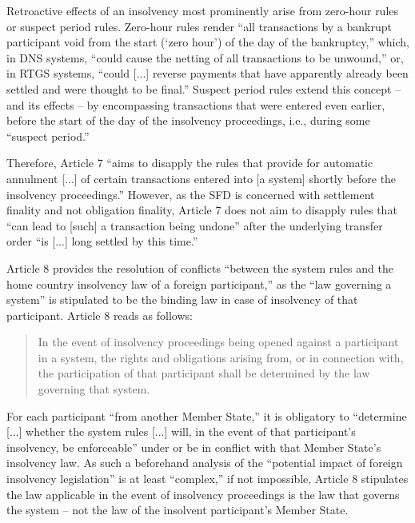 Retroactive effects of an insolvency most prominently arise from zero-hour rules or suspect period rules.
Zero-hour rules render ``all transactions by a bankrupt participant void from the start (`zero hour') of the day of the bankruptcy,'' which, in DNS systems, ``could cause the netting of all transactions to be unwound,'' or, in RTGS systems, ``could [...] reverse payments that have apparently already been settled and were thought to be final.'' \autocite[17]{cpmi2001}
Suspect period rules extend this concept -- and its effects -- by encompassing transactions that were entered even earlier, before the start of the day of the insolvency proceedings, i.e., during some ``suspect period.'' \autocite[57]{vereecken2003}

Therefore, Article 7 ``aims to disapply the rules that provide for automatic annulment [...] of certain transactions entered into [a system] shortly before the insolvency proceedings.'' \autocite[57]{vereecken2003}
However, as the SFD is concerned with settlement finality and not obligation finality, Article 7 does not aim to disapply rules that ``can lead to [such] a transaction being undone'' after the underlying transfer order ``is [...] long settled by this time.'' \autocite[57]{vereecken2003}

Article 8 provides the resolution of conflicts ``between the system rules and the home country insolvency law of a foreign participant,'' as the ``law governing a system'' is stipulated to be the binding law in case of insolvency of that participant. \autocite[19]{cpmi2001}
Article 8 reads as follows: \autocite{eu1998sfd}

\begin{quote}
	In the event of insolvency proceedings being opened against a participant in a system, the rights and obligations arising from, or in connection with, the participation of that participant shall be determined by the law governing that system.
\end{quote}

For each participant ``from another Member State,'' it is obligatory to ``determine [...] whether the system rules [...] will, in the event of that participant's insolvency, be enforceable'' under or be in conflict with that Member State's insolvency law. \autocite[58]{vereecken2003}
As such a beforehand analysis of the ``potential impact of foreign insolvency legislation'' is at least ``complex,'' if not impossible, \autocite[58]{vereecken2003} Article 8 stipulates the law applicable in the event of insolvency proceedings is the law that governs the system -- not the law of the insolvent participant's Member State.

